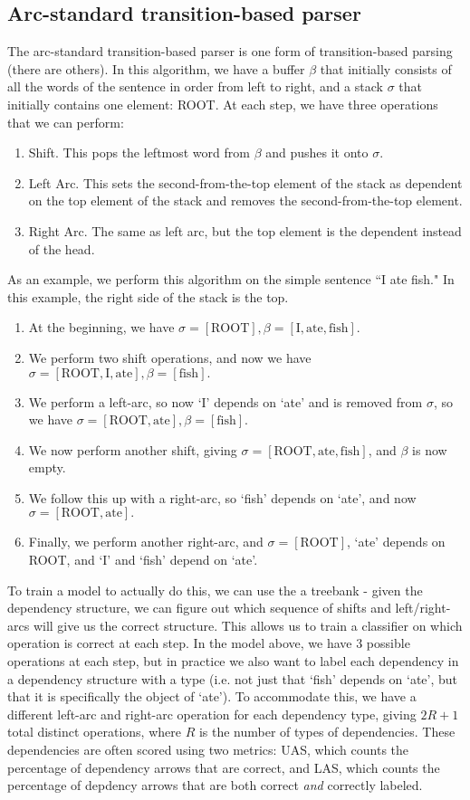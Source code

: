 \subsection{Arc-standard transition-based parser}
The arc-standard transition-based parser is one form of transition-based parsing (there are others). In this algorithm, we have a buffer $\beta$ that initially consists of all the words of the sentence in order from left to right, and a stack $\sigma$ that initially contains one element: ROOT. At each step, we have three operations that we can perform:
\begin{enumerate}
\item Shift. This pops the leftmost word from $\beta$ and pushes it onto $\sigma$.
\item Left Arc. This sets the second-from-the-top element of the stack as dependent on the top element of the stack and removes the second-from-the-top element.
\item Right Arc. The same as left arc, but the top element is the dependent instead of the head.
\end{enumerate}
As an example, we perform this algorithm on the simple sentence ``I ate fish." In this example, the right side of the stack is the top.
\begin{enumerate}
\item At the beginning, we have $\sigma = [\text{ROOT}], \beta = [\text{I}, \text{ate}, \text{fish}].$
\item We perform two shift operations, and now we have $\sigma = [\text{ROOT}, \text{I}, \text{ate}], \beta = [\text{fish}].$
\item We perform a left-arc, so now `I' depends on `ate' and is removed from $\sigma$, so we have $\sigma = [\text{ROOT}, \text{ate}], \beta = [\text{fish}].$
\item We now perform another shift, giving $\sigma = [\text{ROOT}, \text{ate}, \text{fish}]$, and $\beta$ is now empty.
\item We follow this up with a right-arc, so `fish' depends on `ate', and now $\sigma = [\text{ROOT}, \text{ate}].$
\item Finally, we perform another right-arc, and $\sigma = [\text{ROOT}]$, `ate' depends on ROOT, and `I' and `fish' depend on `ate'.
\end{enumerate}
To train a model to actually do this, we can use the a treebank - given the dependency structure, we can figure out which sequence of shifts and left/right-arcs will give us the correct structure. This allows us to train a classifier on which operation is correct at each step. In the model above, we have 3 possible operations at each step, but in practice we also want to label each dependency in a dependency structure with a type (i.e. not just that `fish' depends on `ate', but that it is specifically the object of `ate'). To accommodate this, we have a different left-arc and right-arc operation for each dependency type, giving $2R+1$ total distinct operations, where $R$ is the number of types of dependencies. These dependencies are often scored using two metrics: UAS, which counts the percentage of dependency arrows that are correct, and LAS, which counts the percentage of depdency arrows that are both correct \emph{and} correctly labeled.


